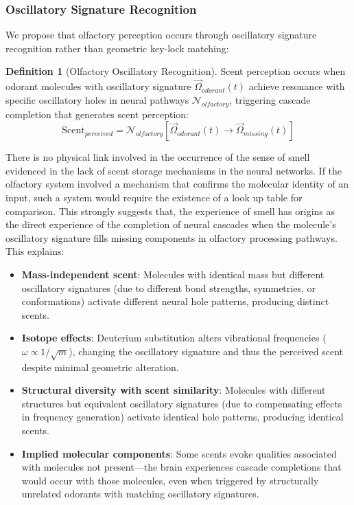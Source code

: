 \documentclass{article}
\theoremstyle{definition}
\newtheorem{definition}[theorem]{Definition}
\theoremstyle{remark}
\begin{document}
\subsubsection{Oscillatory Signature Recognition}

We propose that olfactory perception occurs through oscillatory signature recognition rather than geometric key-lock matching:

\begin{definition}[Olfactory Oscillatory Recognition]
Scent perception occurs when odorant molecules with oscillatory signature $\vec{\Omega}_{odorant}(t)$ achieve resonance with specific oscillatory holes in neural pathways $\mathcal{N}_{olfactory}$, triggering cascade completion that generates scent perception:
\begin{equation}
\text{Scent}_{perceived} = \mathcal{N}_{olfactory}[\vec{\Omega}_{odorant}(t) \rightarrow \vec{\Omega}_{missing}(t)]
\label{eq:olfactory_perception}
\end{equation}
\end{definition}

There is no physical link involved in the occurrence of the sense of smell evidenced in   the lack of scent storage mechanisms in the neural networks. If the olfactory system involved a mechanism that confirms the molecular identity of an input, such a system would require the existence of a look up table for comparison. This strongly suggests that, the experience of smell has origins as the direct experience of the completion of neural cascades when the molecule's oscillatory signature fills missing components in olfactory processing pathways. This explains:

\begin{itemize}
\item \textbf{Mass-independent scent}: Molecules with identical mass but different oscillatory signatures (due to different bond strengths, symmetries, or conformations) activate different neural hole patterns, producing distinct scents.

\item \textbf{Isotope effects}: Deuterium substitution alters vibrational frequencies ($\omega \propto 1/\sqrt{m}$), changing the oscillatory signature and thus the perceived scent despite minimal geometric alteration.

\item \textbf{Structural diversity with scent similarity}: Molecules with different structures but equivalent oscillatory signatures (due to compensating effects in frequency generation) activate identical hole patterns, producing identical scents.

\item \textbf{Implied molecular components}: Some scents evoke qualities associated with molecules not present—the brain experiences cascade completions that would occur with those molecules, even when triggered by structurally unrelated odorants with matching oscillatory signatures.
\end{itemize}
\end{document}
